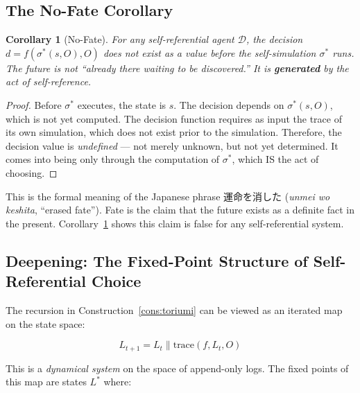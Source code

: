 \documentclass[12pt,a4paper]{article}
\newtheorem{corollary}[theorem]{Corollary}
\theoremstyle{definition}
\theoremstyle{remark}
\newcommand{\cD}{\mathcal{D}}
\begin{document}
\subsection{The No-Fate Corollary}

\begin{corollary}[No-Fate]\label{cor:nofate}
For any self-referential agent $\cD$, the decision
$d = f(\sigma^*(s, O), O)$ \emph{does not exist as a value} before the
self-simulation $\sigma^*$ runs. The future is not ``already there waiting to
be discovered.'' It is \textbf{generated} by the act of self-reference.
\end{corollary}

\begin{proof}
Before $\sigma^*$ executes, the state is $s$. The decision depends on
$\sigma^*(s, O)$, which is not yet computed. The decision function requires
as input the trace of its own simulation, which does not exist prior to the
simulation. Therefore, the decision value is \emph{undefined} --- not merely
unknown, but not yet determined. It comes into being only through the
computation of $\sigma^*$, which IS the act of choosing.
\end{proof}

This is the formal meaning of the Japanese phrase 運命を消した
(\emph{unmei wo keshita}, ``erased fate''). Fate is the claim that the future
exists as a definite fact in the present. Corollary~\ref{cor:nofate} shows
this claim is false for any self-referential system.

\subsection{Deepening: The Fixed-Point Structure of Self-Referential Choice}

The recursion in Construction~\ref{cons:toriumi} can be viewed as an iterated
map on the state space:

\begin{equation}
L_{t+1} = L_t \parallel \text{trace}(f, L_t, O)
\end{equation}

This is a \emph{dynamical system} on the space of append-only logs. The
fixed points of this map are states $L^*$ where:
\end{document}
